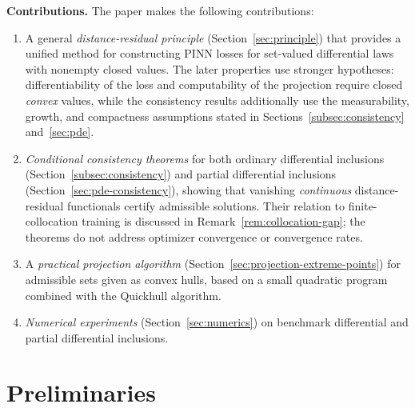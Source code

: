 \documentclass[11pt]{elsarticle}
\theoremstyle{definition}
\theoremstyle{remark}
\numberwithin{equation}{section}
\begin{document}
	\noindent\textbf{Contributions. }
	The paper makes the following contributions:
	\begin{enumerate}
		\item A general \emph{distance-residual principle} (Section~\ref{sec:principle})
		that provides a unified method for constructing PINN losses for
		set-valued differential laws with nonempty closed values. The later
		properties use stronger hypotheses: differentiability of the loss and
		computability of the projection require closed \emph{convex} values,
		while the consistency results additionally use the measurability, growth,
		and compactness assumptions stated in
		Sections~\ref{subsec:consistency} and~\ref{sec:pde}.
		\item \emph{Conditional consistency theorems} for both ordinary differential
		inclusions (Section~\ref{subsec:consistency}) and partial
		differential inclusions (Section~\ref{sec:pde-consistency}), showing that
		vanishing \emph{continuous} distance-residual functionals certify
		admissible solutions. Their relation to finite-collocation training is
		discussed in Remark~\ref{rem:collocation-gap}; the theorems do not
		address optimizer convergence or convergence rates.
		\item A \emph{practical projection algorithm} (Section~\ref{sec:projection-extreme-points})
		for admissible sets given as convex hulls, based on a small quadratic
		program combined with the Quickhull algorithm.
		\item \emph{Numerical experiments} (Section~\ref{sec:numerics}) on
		benchmark differential and partial differential inclusions.
	\end{enumerate}
	
%	
%	
	
	\section{Preliminaries}
	\label{sec:preliminaries}
	
\end{document}
